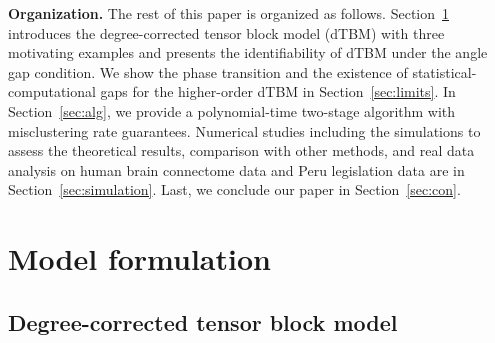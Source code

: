 \documentclass[lettersize,onecolumn,journal]{IEEEtran}
\theoremstyle{definition}
\theoremstyle{definition}
\begin{document}
{
\color{blue}

{\bf Organization.} The rest of this paper is organized as follows. Section~\ref{sec:model} introduces the degree-corrected tensor block model (dTBM) with three motivating examples and presents the identifiability of dTBM under the angle gap condition. We show the phase transition and the existence of statistical-computational gaps for the higher-order dTBM in Section~\ref{sec:limits}. In Section~\ref{sec:alg}, we provide a polynomial-time two-stage algorithm with misclustering rate guarantees. Numerical studies including the simulations to assess the theoretical results, comparison with other methods, and real data analysis on human brain connectome data and Peru legislation data are in Section~\ref{sec:simulation}. Last, we conclude our paper in Section~\ref{sec:con}.

}

\section{Model formulation}\label{sec:model}

\subsection{Degree-corrected tensor block model}
\end{document}
